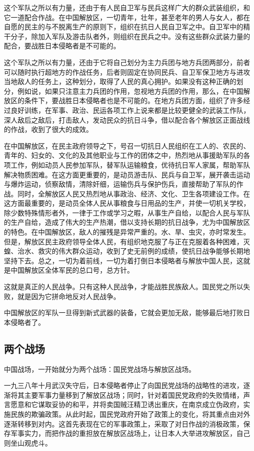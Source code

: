 这个军队之所以有力量，还由于有人民自卫军与民兵这样广大的群众武装组织，和它一道配合作战。在中国解放区，一切青年，壮年，甚至老年的男人与女人，都在自愿的民主的与不脱离生产的原则下，组织在抗日人民自卫军之中。自卫军中的精干分子，除加入军队及游击队者外，则组织在民兵之中。没有这些群众武装力量的配合，要战胜日本侵略者是不可能的。

这个军队之所以有力量，还由于它将自己划分为主力兵团与地方兵团两部分，前者可以随时执行超地方的作战任务，后者则固定在协同民兵、自卫军保卫地方与进攻当地敌人的任务上，这种划分，取得了人民的真心拥护。如果没有这种正确的划分，例如说，如果只注意主力兵团的作用，忽视地方兵团的作用，那么，在中国解放区的条件下，要战胜日本侵略者也是不可能的。在地方兵团方面，组织了许多经过良好训练，在军事、政治、民运各项工作上说来都是比较更健全的武装工作队，深人敌后之敌后，打击敌人，发动民众的抗日斗争，借以配合各个解放区正面战线的作战，收到了很大的成效。

在中国解放区，在民主政府领导之下，号召一切抗日人民组织在工人的、农民的、青年的、妇女的、文化的及其他职业与工作的团体之中，热烈地从事援助军队的各项工作，例如动员人民参加军队，替军队运输粮食，优待抗日军人家属，帮助军队解决物质困难。在这方面更重要的，是动员游击队、民兵与自卫军，展开袭击运动与爆炸运动，侦察敌情，清除奸细，运输伤兵与保护伤兵，直接帮助了军队的作战。同时，全解放区人民又热烈地从事政治、经济、文化、卫生各项建设工作。在这方面最重要的，是动员全体人民从事粮食与日用品的生产，并使一切机关学校，除少数特殊情形者外，一律于工作或学习之暇，从事生产自给，以配合人民与军队的生产自给，造成了伟大的生产热潮，借以支持长期的抗日战争，尤为中国解放区的特色。在中国解放区，敌人的摧残是异常严重的。水、旱、虫灾，亦时常发生。但是，解放区民主政府领导全体人民，有组织地克服了与正在克服着各种困难，灭蝗、治水、救灾的伟大群众运动，收到了史无前例的成绩，使抗日战争能够长期地坚持下去。总之，一切为着前线，一切为着打倒日本侵略者与解放中国人民，这就是中国解放区全体军民的总口号，总方针。

这就是真正的人民战争。只有这种人民战争，才能战胜民族敌人。国民党之所以失败，就是因为它拼命地反对人民战争。

中国解放区的军队一旦得到新式武器的装备，它就会更加无敌，能够最后地打败日本侵略者了。

\subsection{两个战场}

中国战场，一开始就分为两个战场：国民党战场与解放区战场。

一九三八年十月武汉失守后，日本侵略者停止了向国民党战场的战略性的进攻，逐渐将其主要军事力量移到了解放区战场；同时，针对着国民党政府的失败情绪，声言愿意和它谋取妥协的和平，并将卖国贼汪精卫诱出重庆，在南京成立伪政府，实施民族的欺骗政策。从此时起，国民党政府开始了政策上的变化，将其重点由对外逐渐转移到对内。这首先表现在它的军事政策上，采取了对日作战的消极政策，保存军事实力，而把作战的重担放在解放区战场上，让日本人大举进攻解放区，自己则坐山观虎斗。

